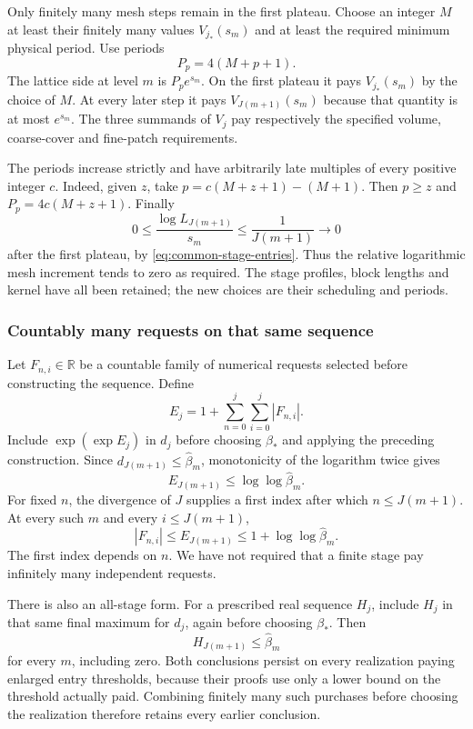 Only finitely many mesh steps remain in the first plateau.
Choose an integer $M$ at least their finitely many values
$V_{j_*}(s_m)$ and at least the required minimum physical period.
Use periods
\[
                       P_p=4(M+p+1).
\]
The lattice side at level $m$ is $P_p e^{s_m}$. On the first
plateau it pays $V_{j_*}(s_m)$ by the choice of $M$. At every
later step it pays $V_{J(m+1)}(s_m)$ because that quantity is at
most $e^{s_m}$. The three summands of $V_j$ pay respectively the
specified volume, coarse-cover and fine-patch requirements.

The periods increase strictly and have arbitrarily late multiples
of every positive integer $c$. Indeed, given $z$, take
$p=c(M+z+1)-(M+1)$. Then $p\ge z$ and
$P_p=4c(M+z+1)$. Finally
\[
 0\le\frac{\log L_{J(m+1)}}{s_m}\le\frac1{J(m+1)}
                           \longrightarrow0
\]
after the first plateau, by \eqref{eq:common-stage-entries}.
Thus the relative logarithmic mesh increment tends to zero as
required. The stage profiles, block lengths and kernel have all
been retained; the new choices are their scheduling and periods.

\subsubsection{Countably many requests on that same sequence}
Let $F_{n,i}\in\mathbb R$ be a countable family of numerical
requests selected before constructing the sequence. Define
\[
       E_j=1+\sum_{n=0}^j\sum_{i=0}^j|F_{n,i}|.
\]
Include $\exp(\exp E_j)$ in $d_j$ before choosing $\beta_*$
and applying the preceding construction. Since
$d_{J(m+1)}\le\widehat\beta_m$, monotonicity of the logarithm
twice gives
\[
                 E_{J(m+1)}\le\log\log\widehat\beta_m.
\]
For fixed $n$, the divergence of $J$ supplies a first index after
which $n\le J(m+1)$. At every such $m$ and every $i\le J(m+1)$,
\begin{equation}\label{eq:common-countable-payment}
 |F_{n,i}|\le E_{J(m+1)}
                     \le1+\log\log\widehat\beta_m.
\end{equation}
The first index depends on $n$. We have not required that a finite
stage pay infinitely many independent requests.

There is also an all-stage form. For a prescribed real sequence
$H_j$, include $H_j$ in that same final maximum for $d_j$, again before
choosing $\beta_*$. Then
\begin{equation}\label{eq:common-allstage-payment}
                  H_{J(m+1)}\le\widehat\beta_m
\end{equation}
for every $m$, including zero. Both conclusions persist on every
realization paying enlarged entry thresholds, because their proofs
use only a lower bound on the threshold actually paid. Combining
finitely many such purchases before choosing the realization
therefore retains every earlier conclusion.

